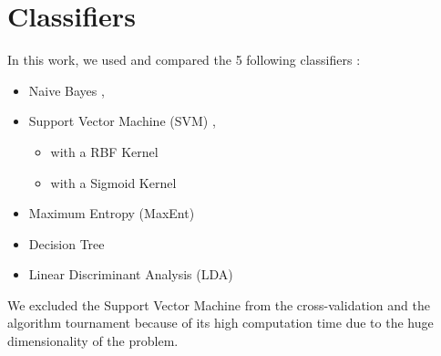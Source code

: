 \section{Classifiers}
\label{sec:classifiers}

In this work, we used and compared the 5 following classifiers :

\begin{itemize}
 \item Naive Bayes \cite{jurafsky2000speech}, \cite{kalousis2013}
 \item {Support Vector Machine (SVM) \cite{cristianini2000introduction},
	\cite{kalousis2013}
	\begin{itemize}
	 \item with a RBF Kernel
	 \item with a Sigmoid Kernel
	\end{itemize}}
 \item Maximum Entropy (MaxEnt)\cite{jurafsky2000speech}
 \item Decision Tree \cite{kalousis2013}
 \item Linear Discriminant Analysis (LDA) \cite{kalousis2013}
\end{itemize}

We excluded the Support Vector Machine from the cross-validation and 
the algorithm tournament because of its high computation time due to the huge
dimensionality of the problem.